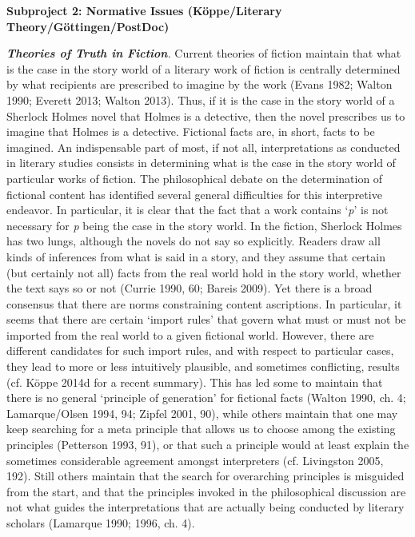 
\vspace{.2cm}
\noindent\textbf{Subproject 2: Normative Issues (K\"oppe/Literary Theory/G\"ottingen/PostDoc)}
\vspace{.2cm}

\noindent\textbf{\emph{Theories of Truth in Fiction}}\emph{.} Current theories of fiction maintain that what is the case in the story world of a literary work of fiction is centrally determined by what recipients are prescribed to imagine by the work (Evans 1982; Walton 1990; Everett 2013; Walton 2013). Thus, if it is the case in the story world of a Sherlock Holmes novel that Holmes is a detective, then the novel prescribes us to imagine that Holmes is a detective. Fictional facts are, in short, facts to be imagined. An indispensable part of most, if not all, interpretations as conducted in literary studies consists in determining what is the case in the story world of particular works of fiction. The philosophical debate on the determination of fictional content has identified several general difficulties for this interpretive endeavor. In particular, it is clear that the fact that a work contains `\emph{p}' is not necessary for \emph{p} being the case in the story world. In the fiction, Sherlock Holmes has two lungs, although the novels do not say so explicitly. Readers draw all kinds of inferences from what is said in a story, and they assume that certain (but certainly not all) facts from the real world hold in the story world, whether the text says so or not (Currie 1990, 60; Bareis 2009). Yet there is a broad consensus that there are norms constraining content ascriptions. In particular, it seems that there are certain `import rules' that govern what must or must not be imported from the real world to a given fictional world. However, there are different candidates for such import rules, and with respect to particular cases, they lead to more or less intuitively plausible, and sometimes conflicting, results (cf. K\"oppe 2014d for a recent summary). This has led some to maintain that there is no general `principle of generation' for fictional facts (Walton 1990, ch. 4; Lamarque/Olsen 1994, 94; Zipfel 2001, 90), while others maintain that one may keep searching for a meta principle that allows us to choose among the existing principles (Petterson 1993, 91), or that such a principle would at least explain the sometimes considerable agreement amongst interpreters (cf. Livingston 2005, 192). Still others maintain that the search for overarching principles is misguided from the start, and that the principles invoked in the philosophical discussion are not what guides the interpretations that are actually being conducted by literary scholars (Lamarque 1990; 1996, ch. 4).

